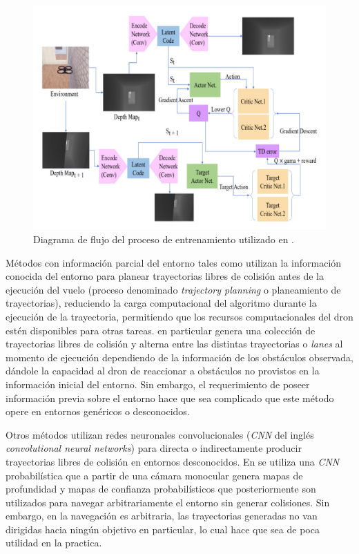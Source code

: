     \begin{figure}[H]
        \centering
        \includegraphics[scale=0.4]{partes/ImgJoao/RL-training-process.png}
        \caption[Diagrama de flujo del proceso de entrenamiento utilizado en \textit{Vision Based Drone Obstacle Avoidance by Deep Reinforcement Learning}]{Diagrama de flujo del proceso de entrenamiento utilizado en \cite{Xue2021}.}
        \label{fig:rl-training-process}
    \end{figure}

    \par Métodos con información parcial del entorno tales como \cite{Zhang2019} utilizan la información conocida del entorno para planear trayectorias libres de colisión antes de la ejecución del vuelo (proceso denominado \textit{trajectory planning} o planeamiento de trayectorias), reduciendo la carga computacional del algoritmo durante la ejecución de la trayectoria, permitiendo que los recursos computacionales del dron estén disponibles para otras tareas. \cite{Zhang2019} en particular genera una colección de trayectorias libres de colisión y alterna entre las distintas trayectorias o \textit{lanes} al momento de ejecución dependiendo de la información de los obstáculos observada, dándole la capacidad al dron de reaccionar a obstáculos no provistos en la información inicial del entorno. Sin embargo, el requerimiento de poseer información previa sobre el entorno hace que sea complicado que este método opere en entornos genéricos o desconocidos.

    \par Otros métodos utilizan redes neuronales convolucionales (\textit{CNN} del inglés \textit{convolutional neural networks}) para directa o indirectamente producir trayectorias libres de colisión en entornos desconocidos. En \cite{Yang2021} se utiliza una \textit{CNN} probabilística que a partir de una cámara monocular genera mapas de profundidad y mapas de confianza probabilísticos que posteriormente son utilizados para navegar arbitrariamente el entorno sin generar colisiones. Sin embargo, en \cite{Yang2021} la navegación es arbitraria, las trayectorias generadas no van dirigidas hacia ningún objetivo en particular, lo cual hace que sea de poca utilidad en la practica.

